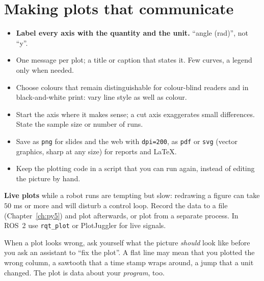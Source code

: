 \section*{Making plots that communicate}
\begin{itemize}[nosep]
  \item \textbf{Label every axis with the quantity and the unit.} ``angle (rad)'', not ``y''.
  \item One message per plot; a title or caption that states it. Few curves, a legend only when needed.
  \item Choose colours that remain distinguishable for colour-blind readers and in black-and-white print: vary line style as well as colour.
  \item Start the axis where it makes sense; a cut axis exaggerates small differences. State the sample size or number of runs.
  \item Save as \texttt{png} for slides and the web with \texttt{dpi=200}, as \texttt{pdf} or \texttt{svg} (vector graphics, sharp at any size) for reports and \LaTeX.
  \item Keep the plotting code in a script that you can run again, instead of editing the picture by hand.
\end{itemize}
\textbf{Live plots} while a robot runs are tempting but slow: redrawing a figure can take $50$ ms or more and will disturb a control loop. Record the data to a file (Chapter~\ref{ch:py5}) and plot afterwards, or plot from a separate process. In ROS~2 use \texttt{rqt\_plot} or PlotJuggler for live signals.

\begin{aibox}
When a plot looks wrong, ask yourself what the picture \emph{should} look like before you ask an assistant to ``fix the plot''. A flat line may mean that you plotted the wrong column, a sawtooth that a time stamp wraps around, a jump that a unit changed. The plot is data about your \emph{program}, too.
\end{aibox}

